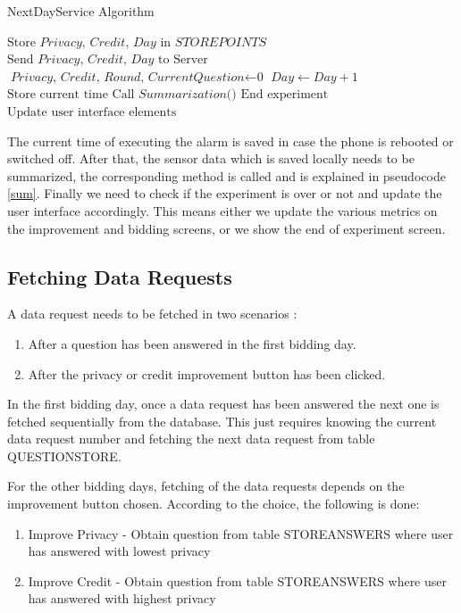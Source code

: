\begin{algorithm}
\caption{NextDayService Algorithm}\label{nextday}
\begin{algorithmic}[1]
\State $\text{Store }\textit{Privacy, Credit, Day } \text{in } \textit{STOREPOINTS}$
\State $\text{Send }\textit{Privacy, Credit, Day } \text{to Server}$
\State $\textit{Privacy, Credit, Round, CurrentQuestion} \gets \text{0}$
\State $\textit{Day} \gets \textit{Day}+1$
\State $\text{Store current time}$
\State $\text{Call }\textit{Summarization()}$
  \State $\text{End experiment}$
\Else
  \State $\text{Update user interface elements}$ 
\EndIf
\EndProcedure
\end{algorithmic}
\end{algorithm}

The current time of executing the alarm is saved in case the phone is rebooted or switched off. After that, the sensor data which is saved locally
needs to be summarized, the corresponding method is called and is explained in pseudocode \ref{sum}. Finally we need to check if the experiment is over or not and update the user interface accordingly. This means either we update the various metrics on the improvement and bidding screens, or we 
show the end of experiment screen.

\subsection{Fetching Data Requests}
A data request needs to be fetched in two scenarios :

\begin{enumerate}
	\item After a question has been answered in the first bidding day.
	\item After the privacy or credit improvement button has been clicked.
\end{enumerate}

In the first bidding day, once a data request has been answered the next one is fetched sequentially from the database. This just requires knowing the current data request number and fetching the next data request from table QUESTIONSTORE. 

For the other bidding days, fetching of the data requests depends on the improvement button chosen. According to the choice, the following is done:

\begin{enumerate}
	\item Improve Privacy - Obtain question from table STOREANSWERS where user has answered with lowest privacy
	\item Improve Credit - Obtain question from table STOREANSWERS where user has answered with highest privacy
\end{enumerate}

